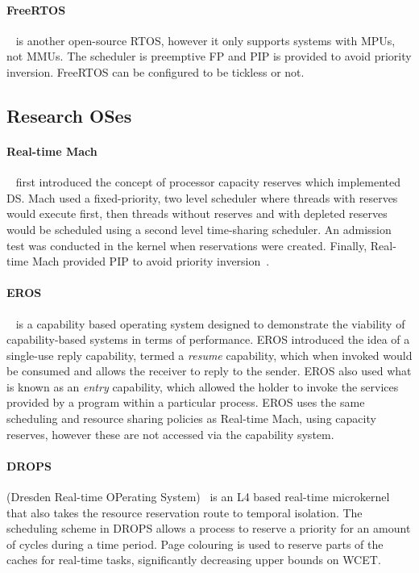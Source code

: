\paragraph{FreeRTOS}~\citep{FreeRTOS:URL} is another open-source \gls{RTOS}, however it only supports systems with \glspl{MPU}, not
\glspl{MMU}. The scheduler is preemptive \gls{FP} and \gls{PIP} is provided to avoid priority inversion.
FreeRTOS can be configured to be tickless or not.

\subsection{Research OSes}

\paragraph{Real-time Mach}~\citep{Mercer_RZ_94, Mercer_ST_93} first introduced the concept of
processor capacity reserves which implemented \gls{DS}. Mach used a fixed-priority, two level 
scheduler where threads with reserves would execute first, then threads without reserves and with
depleted reserves would be scheduled using a second level time-sharing scheduler.
An admission test was conducted in the kernel when reservations were created. 
Finally, Real-time Mach provided \gls{PIP} to avoid priority inversion~\citep{Tokuda_NR_90}.

\paragraph{EROS}~\citep{Shapiro_SF_99} is a capability based operating system designed to
demonstrate the viability of capability-based systems in terms of performance.  EROS introduced the
idea of a single-use reply capability, termed a \emph{resume} capability, which when invoked would
be consumed and allows the receiver to reply to the sender.  EROS also used what is known as an
\emph{entry} capability, which allowed the holder to invoke the services provided by a program
within a particular process.  EROS uses the same scheduling and resource sharing policies as
Real-time Mach, using capacity reserves, however these are not accessed via the capability system.

\paragraph{DROPS} (Dresden Real-time OPerating System)~\citep{Haertig_BBHHMRSW_98} is an L4 based
real-time microkernel that also takes the resource reservation route to temporal isolation.  The
scheduling scheme in DROPS allows a process to reserve a priority for an amount of cycles during a
time period.  Page colouring is used to reserve parts of the caches for real-time tasks,
significantly decreasing upper bounds on \gls{WCET}.

